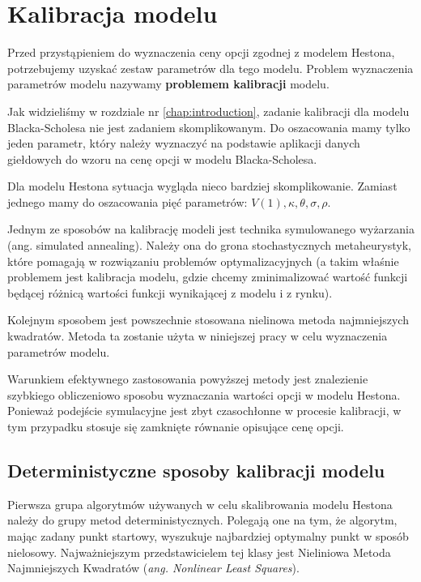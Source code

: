 \documentclass{pracamgr}
\begin{document}
\chapter{Kalibracja modelu}
\label{chap:chapterModelCalibration}



Przed przystąpieniem do wyznaczenia ceny opcji zgodnej z modelem Hestona, potrzebujemy uzyskać zestaw 
parametrów dla tego modelu. Problem wyznaczenia parametrów modelu 
nazywamy \textbf{problemem kalibracji} modelu.  

Jak widzieliśmy w rozdziale nr \ref{chap:introduction}, zadanie kalibracji dla modelu Blacka-Scholesa 
nie jest zadaniem skomplikowanym. Do oszacowania mamy tylko jeden parametr, który należy wyznaczyć na 
podstawie aplikacji danych giełdowych do wzoru na cenę opcji w modelu Blacka-Scholesa.

Dla modelu Hestona sytuacja wygląda nieco bardziej skomplikowanie. Zamiast jednego mamy do 
oszacowania pięć parametrów:
$V(1),\kappa, \theta, \sigma, \rho$.  



Jednym ze sposobów na kalibrację modeli jest technika symulowanego 
wyżarzania (ang. simulated annealing). Należy ona do 
grona stochastycznych metaheurystyk,  które pomagają w rozwiązaniu problemów 
optymalizacyjnych (a takim właśnie problemem 
jest kalibracja modelu, gdzie chcemy zminimalizować wartość funkcji będącej różnicą wartości funkcji 
wynikającej z modelu i z rynku).

Kolejnym sposobem jest powszechnie stosowana nielinowa metoda najmniejszych kwadratów. Metoda ta 
zostanie użyta w niniejszej pracy w celu wyznaczenia parametrów modelu.

Warunkiem efektywnego zastosowania powyższej metody jest znalezienie szybkiego obliczeniowo sposobu 
wyznaczania wartości opcji w 
modelu Hestona. Ponieważ podejście symulacyjne jest zbyt czasochłonne w procesie kalibracji, w tym 
przypadku stosuje 
się zamknięte równanie opisujące cenę opcji.


\section{Deterministyczne sposoby kalibracji modelu} 
Pierwsza grupa algorytmów używanych w celu skalibrowania modelu Hestona należy do grupy metod 
deterministycznych.
Polegają one na tym, że algorytm, mając zadany punkt startowy, wyszukuje najbardziej optymalny
punkt w sposób nielosowy.
Najważniejszym przedstawicielem tej klasy jest Nieliniowa Metoda Najmniejszych Kwadratów 
(\textit{ang. Nonlinear Least Squares}).
\end{document}
